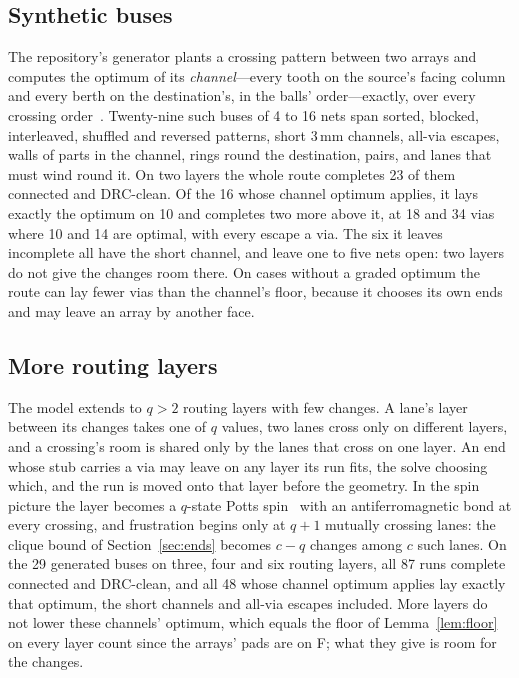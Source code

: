 \documentclass[journal]{IEEEtran}
\begin{document}
\subsection{Synthetic buses}
\label{sec:synth}
The repository's generator plants a crossing pattern between two arrays and computes the optimum of its \emph{channel}---every tooth on the source's facing column and every berth on the destination's, in the balls' order---exactly, over every crossing order~\cite{krt}. Twenty-nine such buses of 4 to 16 nets span sorted, blocked, interleaved, shuffled and reversed patterns, short 3\,mm channels, all-via escapes, walls of parts in the channel, rings round the destination, pairs, and lanes that must wind round it. On two layers the whole route completes 23 of them connected and DRC-clean. Of the 16 whose channel optimum applies, it lays exactly the optimum on 10 and completes two more above it, at 18 and 34 vias where 10 and 14 are optimal, with every escape a via. The six it leaves incomplete all have the short channel, and leave one to five nets open: two layers do not give the changes room there. On cases without a graded optimum the route can lay fewer vias than the channel's floor, because it chooses its own ends and may leave an array by another face.

\subsection{More routing layers}
\label{sec:layers}
The model extends to $q>2$ routing layers with few changes. A lane's layer between its changes takes one of $q$ values, two lanes cross only on different layers, and a crossing's room is shared only by the lanes that cross on one layer. An end whose stub carries a via may leave on any layer its run fits, the solve choosing which, and the run is moved onto that layer before the geometry. In the spin picture the layer becomes a $q$-state Potts spin~\cite{wu1982potts} with an antiferromagnetic bond at every crossing, and frustration begins only at $q+1$ mutually crossing lanes: the clique bound of Section~\ref{sec:ends} becomes $c-q$ changes among $c$ such lanes. On the 29 generated buses on three, four and six routing layers, all 87 runs complete connected and DRC-clean, and all 48 whose channel optimum applies lay exactly that optimum, the short channels and all-via escapes included. More layers do not lower these channels' optimum, which equals the floor of Lemma~\ref{lem:floor} on every layer count since the arrays' pads are on F; what they give is room for the changes.
\end{document}
